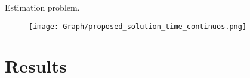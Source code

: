 \documentclass[9pt]{beamer}
\begin{document}
\begin{frame}{Estimation problem.}
        \begin{figure}[H]
    \centering
     
    \texttt{[image: Graph/proposed\_solution\_time\_continuos.png]}  
     
\end{figure}
\end{frame}

 
\section{Results}
\end{document}
